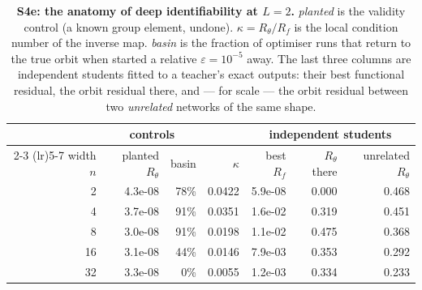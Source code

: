 \begin{table}[t]
\centering\small
\caption{\textbf{S4e: the anatomy of deep identifiability at $L=2$.} \emph{planted} is the validity control (a known group element, undone). $\kappa = R_\theta/R_f$ is the local condition number of the inverse map. \emph{basin} is the fraction of optimiser runs that return to the true orbit when started a relative $\varepsilon = 10^{-5}$ away. The last three columns are independent students fitted to a teacher's exact outputs: their best functional residual, the orbit residual there, and --- for scale --- the orbit residual between two \emph{unrelated} networks of the same shape.}
\label{tab:s4e}
\begin{tabular}{@{}rrrrrrr@{}}
\toprule
& \multicolumn{2}{c}{controls} & & \multicolumn{3}{c}{independent students} \\
\cmidrule(lr){2-3} \cmidrule(lr){5-7}
width $n$ & planted $R_\theta$ & basin & $\kappa$ & best $R_f$ & $R_\theta$ there & unrelated $R_\theta$ \\
\midrule
2 & 4.3e-08 & 78\% & 0.0422 & 5.9e-08 & 0.000 & 0.468 \\
4 & 3.7e-08 & 91\% & 0.0351 & 1.6e-02 & 0.319 & 0.451 \\
8 & 3.0e-08 & 91\% & 0.0198 & 1.1e-02 & 0.475 & 0.368 \\
16 & 3.1e-08 & 44\% & 0.0146 & 7.9e-03 & 0.353 & 0.292 \\
32 & 3.3e-08 & 0\% & 0.0055 & 1.2e-03 & 0.334 & 0.233 \\
\bottomrule
\end{tabular}
\end{table}

